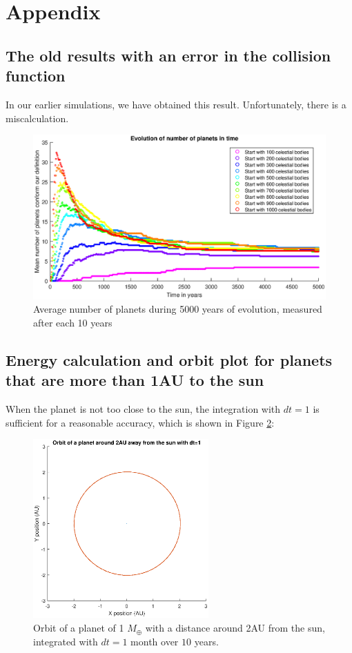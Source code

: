 \section{Appendix}
\subsection{The old results with an error in the collision function}
In our earlier simulations, we have obtained this result. Unfortunately, there is a miscalculation.
\begin{figure}[H]
\centering
\includegraphics[scale=0.8]{APgrafiek.eps}
\caption{Average number of planets during 5000 years of evolution, measured after each 10 years}
    \label{fig:AantPlaneten}
\end{figure}
\subsection{Energy calculation and orbit plot for planets that are more than 1AU to the sun}
When the planet is not too close to the sun, the integration with $dt=1$ is sufficient for a reasonable accuracy, which is shown in Figure \ref{fig:Planet2AUdt1}:

\begin{figure}[H]
\centering
\includegraphics[width=0.6\textwidth]{Planeet_2AU_dt1_10jaar.eps}
\caption{Orbit of a planet of 1 $M_{\oplus}$ with a distance around 2AU from the sun, integrated with $dt=1$ month over $10$ years.}
    \label{fig:Planet2AUdt1}
\end{figure}

